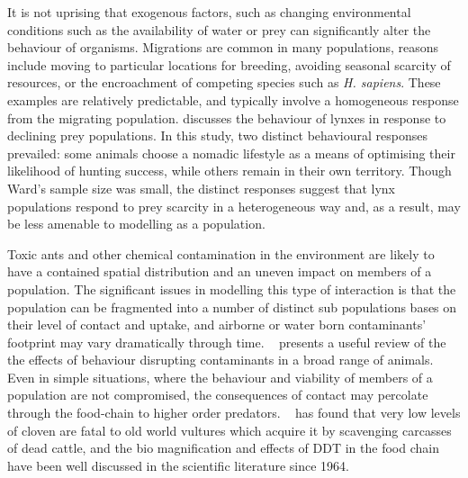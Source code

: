 It is not uprising that exogenous factors, such as changing
environ\-mental conditions such as the availability of water or prey
can significantly alter the behaviour of organisms.  Migrations are
common in many populations, reasons include moving to particular
locations for breeding, avoiding seasonal scarcity of resources, or
the encroachment of competing species such as \emph{H. sapiens}.
These examples are relatively predictable, and typically involve a
homogeneous response from the migrating population.
\cite{ward1985behavioural} discusses the behaviour of
lynxes in response to declining prey populations. In this study, two
distinct behavioural responses prevailed: some animals choose a
nomadic lifestyle as a means of optimising their likelihood of hunting
success, while others remain in their own territory.  Though Ward's
sample size was small, the distinct responses suggest that lynx
populations respond to prey scarcity in a heterogeneous way and, as a
result, may be less amenable to modelling as a population.

Toxic ants and other chemical contamination in the environment are
likely to have a contained spatial distribution and an uneven impact
on members of a population. The significant issues in modelling this
type of interaction is that the population can be fragmented into a
number of distinct sub populations bases on their level of contact and
uptake, and airborne or water born contaminants' footprint may vary
dramatically through time. ~\cite{zala2004abnormal} presents a useful
review of the the effects of behaviour disrupting contaminants in a
broad range of animals.  Even in simple situations, where the behaviour
and viability of members of a population are not compromised, the
consequences of contact may percolate through the food-chain to higher
order predators. ~\cite{swan2006toxicity} has found that very low
levels of cloven are fatal to old world vultures which acquire it
by scavenging carcasses of dead cattle, and the bio magnification and
effects of DDT in the food chain have been well discussed in the
scientific literature since 1964.

